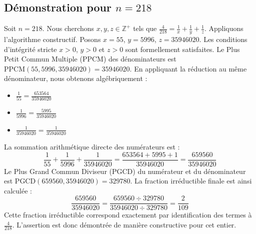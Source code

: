 \documentclass[11pt,a4paper]{article}
\begin{document}
\subsection{Démonstration pour $n = 218$}
Soit $n = 218$. Nous cherchons $x, y, z \in \mathbb{Z}^{+}$ tels que $\frac{4}{218} = \frac{1}{x} + \frac{1}{y} + \frac{1}{z}$.
Appliquons l'algorithme constructif. Posons $x = 55$, $y = 5996$, $z = 35946020$.
Les conditions d'intégrité stricte $x > 0$, $y > 0$ et $z > 0$ sont formellement satisfaites.
Le Plus Petit Commun Multiple (PPCM) des dénominateurs est $\text{PPCM}(55, 5996, 35946020) = 35946020$.
En appliquant la réduction au même dénominateur, nous obtenons algébriquement :
\begin{itemize}
    \item $\frac{1}{55} = \frac{653564}{35946020}$
    \item $\frac{1}{5996} = \frac{5995}{35946020}$
    \item $\frac{1}{35946020} = \frac{1}{35946020}$
\end{itemize}
La sommation arithmétique directe des numérateurs est :
$$ \frac{1}{55} + \frac{1}{5996} + \frac{1}{35946020} = \frac{653564 + 5995 + 1}{35946020} = \frac{659560}{35946020} $$
Le Plus Grand Commun Diviseur (PGCD) du numérateur et du dénominateur est $\text{PGCD}(659560, 35946020) = 329780$.
La fraction irréductible finale est ainsi calculée :
$$ \frac{659560}{35946020} = \frac{659560 \div 329780}{35946020 \div 329780} = \frac{2}{109} $$
Cette fraction irréductible correspond exactement par identification des termes à $\frac{4}{218}$. L'assertion est donc démontrée de manière constructive pour cet entier.
\end{document}
